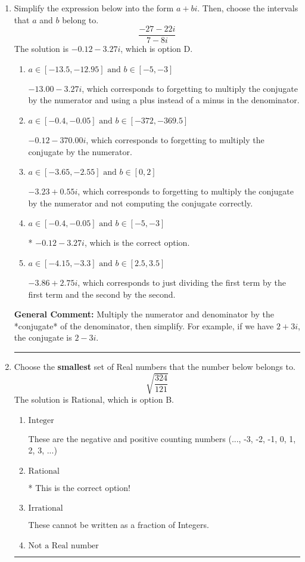 \documentclass{extbook}[14pt]
\newcommand{\litem}[1]{\item #1

\rule{\textwidth}{0.4pt}}
\begin{document}
\begin{enumerate}\litem{
Simplify the expression below into the form $a+bi$. Then, choose the intervals that $a$ and $b$ belong to.
\[ \frac{-27 - 22 i}{7 - 8 i} \]The solution is \( -0.12  - 3.27 i \), which is option D.\begin{enumerate}[label=\Alph*.]
\item \( a \in [-13.5, -12.95] \text{ and } b \in [-5, -3] \)

 $-13.00  - 3.27 i$, which corresponds to forgetting to multiply the conjugate by the numerator and using a plus instead of a minus in the denominator.
\item \( a \in [-0.4, -0.05] \text{ and } b \in [-372, -369.5] \)

 $-0.12  - 370.00 i$, which corresponds to forgetting to multiply the conjugate by the numerator.
\item \( a \in [-3.65, -2.55] \text{ and } b \in [0, 2] \)

 $-3.23  + 0.55 i$, which corresponds to forgetting to multiply the conjugate by the numerator and not computing the conjugate correctly.
\item \( a \in [-0.4, -0.05] \text{ and } b \in [-5, -3] \)

* $-0.12  - 3.27 i$, which is the correct option.
\item \( a \in [-4.15, -3.3] \text{ and } b \in [2.5, 3.5] \)

 $-3.86  + 2.75 i$, which corresponds to just dividing the first term by the first term and the second by the second.
\end{enumerate}

\textbf{General Comment:} Multiply the numerator and denominator by the *conjugate* of the denominator, then simplify. For example, if we have $2+3i$, the conjugate is $2-3i$.
}
\litem{
Choose the \textbf{smallest} set of Real numbers that the number below belongs to.
\[ \sqrt{\frac{324}{121}} \]The solution is \( \text{Rational} \), which is option B.\begin{enumerate}[label=\Alph*.]
\item \( \text{Integer} \)

These are the negative and positive counting numbers (..., -3, -2, -1, 0, 1, 2, 3, ...)
\item \( \text{Rational} \)

* This is the correct option!
\item \( \text{Irrational} \)

These cannot be written as a fraction of Integers.
\item \( \text{Not a Real number} \)


\end{enumerate}}
\end{enumerate}
\end{document}

